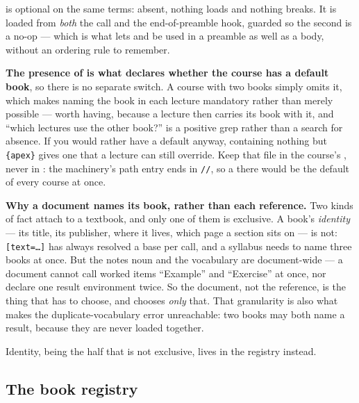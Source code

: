 is optional on the same terms: absent, nothing loads and
nothing breaks. It is loaded from \emph{both} the  call and
the end-of-preamble hook, guarded so the second is a no-op --- which is
what lets  and  be used in a preamble as
well as a body, without an ordering rule to remember.

\textbf{The presence of  is what declares whether the
course has a default book}, so there is no separate switch. A course with
two books simply omits it, which makes naming the book in each lecture
mandatory rather than merely possible --- worth having, because a lecture
then carries its book with it, and ``which lectures use the other book?''
is a positive grep rather than a search for absence. If you would rather
have a default anyway,  containing nothing but
\texttt{\{apex\}} gives one that a lecture can still override.
Keep that file in the course's , never in : the machinery's path entry ends in \texttt{//}, so a  there would be the default of every course at once.

\textbf{Why a document names its book, rather than each reference.} Two
kinds of fact attach to a textbook, and only one of them is exclusive.
A book's \emph{identity} --- its title, its publisher, where it lives,
which page a section sits on --- is not: \texttt{[text=\dots]}
has always resolved a base per call, and a syllabus needs to name three
books at once. But the notes noun and the  vocabulary
are document-wide --- a document cannot call worked items ``Example'' and
``Exercise'' at once, nor declare one result environment twice. So the
document, not the reference, is the thing that has to choose, and
 chooses \emph{only} that. That granularity is also what makes
the duplicate-vocabulary error unreachable: two books may both name a
result, because they are never loaded together.

Identity, being the half that is not exclusive, lives in the registry
instead.

\subsection*{The book registry}

\begin{manexsource}
\end{manexsource}

